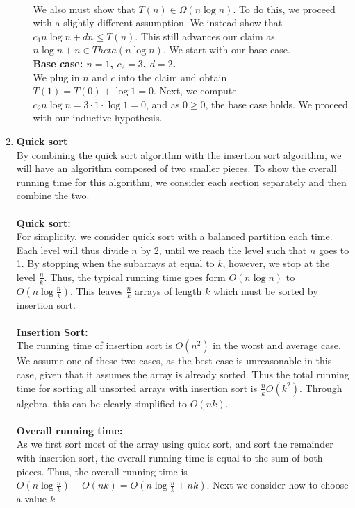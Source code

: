 \documentclass{article}
\begin{document}
\begin{enumerate}
\begin{enumerate}
\\We also must show that $T(n) \in \Omega(n\log n)$. To do this, we proceed with a slightly different assumption. We instead show that $c_1 n \log n + dn \leq T(n)$. This still advances our claim as $n \log n + n \in Theta(n \log n)$. We start with our base case.
	\\ \textbf{Base case: $n=1$, $c_2=3$, $d=2$.}
	\\ We plug in $n$ and $c$ into the claim and obtain $T(1)=T(0)+\log 1= 0$. Next, we compute $c_2 n \log n = 3 \cdot 1 \cdot \log 1 = 0$, and as $0 \geq 0$, the base case holds. We proceed with our inductive hypothesis.

	\end{enumerate}
\item \textbf{Quick sort}
	\\ By combining the quick sort algorithm with the insertion sort algorithm, we will have an algorithm composed of two smaller pieces. To show the overall running time for this algorithm, we consider each section separately and then combine the two.
	\\ \\ \textbf{Quick sort:}
	\\ For simplicity, we consider quick sort with a balanced partition each time. Each level will thus divide $n$ by 2, until we reach the level such that $n$ goes to 1. By stopping when the subarrays at equal to $k$, however, we stop at the level $\frac{n}{k}$. Thus, the typical running time goes form $O(n\log n)$ to $O(n\log \frac{n}{k})$. This leaves $\frac{n}{k}$ arrays of length $k$ which must be sorted by insertion sort.
	\\ \\ \textbf{Insertion Sort:}
	\\ The running time of insertion sort is $O(n^2)$ in the worst and average case. We assume one of these two cases, as the best case is unreasonable in this case, given that it assumes the array is already sorted. Thus the total running time for sorting all unsorted arrays with insertion sort is $\frac{n}{k}O(k^2)$. Through algebra, this can be clearly simplified to $O(nk)$.
	\\ \\ \textbf{Overall running time:}
	\\ As we first sort most of the array using quick sort, and sort the remainder with insertion sort, the overall running time is equal to the sum of both pieces. Thus, the overall running time is $O(n\log \frac{n}{k}) + O(nk)= O(n\log \frac{n}{k} + nk)$. Next we consider how to choose a value $k$

\end{enumerate}
\end{document}
